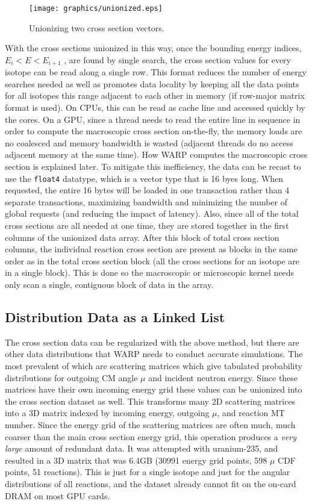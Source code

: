\begin{figure}[h!] 
\centering
\texttt{[image: graphics/unionized.eps]}
\caption{Unionizing two cross section vectors. \label{unionized_layout} }
\end{figure}

With the cross sections unionized in this way, once the bounding energy indices, $E_i<E<E_{i+1}$ , are found by single search, the cross section values for every isotope can be read along a single row.  This format reduces the number of energy searches needed as well as promotes data locality by keeping all the data points for all isotopes this range adjacent to each other in memory (if row-major matrix format is used).  On CPUs, this can be read as cache line and accessed quickly by the cores.  On a GPU, since a thread needs to read the entire line in sequence in order to compute the macroscopic cross section on-the-fly, the memory loads are no coalesced and memory bandwidth is wasted (adjacent threads do no access adjacent memory at the same time).  How WARP computes the macroscopic cross section is explained later.  To mitigate this inefficiency, the data can be recast to use the  \lstinline{float4} datatype, which is a vector type that is 16 byes long.  When requested, the entire 16 bytes will be loaded in one transaction rather than 4 separate transactions, maximizing bandwidth and minimizing the number of global requests (and reducing the impact of latency).  Also, since all of the total cross sections are all needed at one time, they are stored together in the first columns of the unionized data array.  After this block of total cross section columns, the individual reaction cross section are present as blocks in the same order as in the total cross section block (all the cross sections for an isotope are in a single block).  This is done so the macroscopic or microscopic kernel needs only scan a single, contiguous block of data in the array.

\subsection{Distribution Data as a Linked List}

The cross section data can be regularized with the above method, but there are other data distributions that WARP needs to conduct accurate simulations.  The most prevalent of which are scattering matrices which give tabulated probability distributions for outgoing CM angle $\mu$ and incident neutron energy.  Since these matrices have their own incoming energy grid these values can be unionized into the cross section dataset as well.  This transforms many 2D scattering matrices into a 3D matrix indexed by incoming energy, outgoing $\mu$, and reaction MT number.  Since the energy grid of the scattering matrices are often much, much coarser than the main cross section energy grid, this operation produces a \emph{very large} amount of redundant data.  It was attempted with uranium-235, and resulted in a 3D matrix that was 6.4GB (30991 energy grid points, 598 $\mu$ CDF points, 51 reactions).  This is just for a single isotope and just for the angular distributions of all reactions, and the dataset already cannot fit on the on-card DRAM on most GPU cards.  

